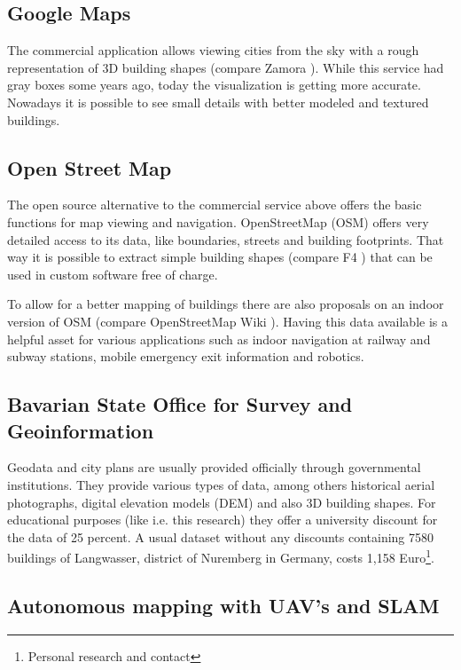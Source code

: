 \subsection{Google Maps \textsuperscript{\textregistered} }

The commercial application allows viewing cities from the sky with a rough representation of 3D building shapes (compare Zamora \parencite{google_maps}). While this service had gray boxes some years ago, today the visualization is getting more accurate. Nowadays it is possible to see small details with better modeled and textured buildings.

\subsection{Open Street Map \textsuperscript{\textregistered} }

The open source alternative to the commercial service above offers the basic functions for map viewing and navigation. OpenStreetMap (OSM) offers very detailed access to its data, like boundaries, streets and building footprints. That way it is possible to extract simple building shapes (compare F4 \parencite{f4map}) that can be used in custom software free of charge.

To allow for a better mapping of buildings there are also proposals on an indoor version of OSM (compare OpenStreetMap Wiki \parencite{openstreetmap_wiki}). Having this data available is a helpful asset for various applications such as indoor navigation at railway and subway stations, mobile emergency exit information and robotics.

\subsection{Bavarian State Office for Survey and Geoinformation}

Geodata and city plans are usually provided officially through governmental institutions. They provide various types of data, among others historical aerial photographs, digital elevation models (DEM) and also 3D building shapes. For educational purposes (like i.e. this research) they offer a university discount for the data of 25 percent. A usual dataset without any discounts containing 7580 buildings of Langwasser, district of Nuremberg in Germany, costs 1,158 Euro\footnote{Personal research and contact}.

\subsection{Autonomous mapping with UAV's and SLAM}

